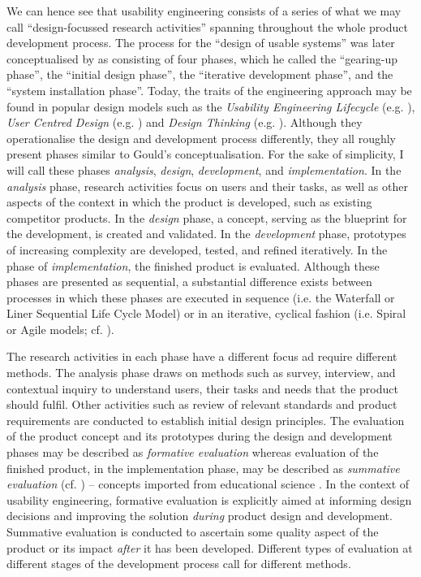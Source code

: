 We can hence see that usability engineering consists of a series of what we may call “design-focussed research activities” spanning throughout the whole product development process. The process for the ``design of usable systems'' was later conceptualised by \citet{gould1988design} as consisting of four phases, which he called the ``gearing-up phase'', the ``initial design phase'', the ``iterative development phase'', and the ``system installation phase''. Today, the traits of the engineering approach may be found in popular design models such as the \textit{Usability Engineering Lifecycle} (e.g. \cite{mayhew2007requirements,nielsen1992usability,nielsen1993usability}), \textit{User Centred Design} (e.g. \cite{still2017fundamentals}) and \textit{Design Thinking} (e.g. \cite{brown2009}). Although they operationalise the design and development process differently, they all roughly present phases similar to Gould’s conceptualisation. For the sake of simplicity, I will call these phases \textit{analysis}, \textit{design}, \textit{development}, and \textit{implementation}. In the \textit{analysis} phase, research activities focus on users and their tasks, as well as other aspects of the context in which the product is developed, such as existing competitor products. In the \textit{design} phase, a concept, serving as the blueprint for the development, is created and validated. In the \textit{development} phase, prototypes of increasing complexity are developed, tested, and refined iteratively. In the phase of \textit{implementation}, the finished product is evaluated. Although these phases are presented as sequential, a substantial difference exists between processes in which these phases are executed in sequence (i.e. the Waterfall or Liner Sequential Life Cycle Model) or in an iterative, cyclical fashion (i.e. Spiral or Agile models; cf. \cite{van2017barriers}).

The research activities in each phase have a different focus ad require different methods. The analysis phase draws on methods such as survey, interview, and contextual inquiry to understand users, their tasks and needs that the product should fulfil. Other activities such as review of relevant standards and product requirements are conducted to establish initial design principles. The evaluation of the product concept and its prototypes during the design and development phases may be described as \textit{formative evaluation} whereas evaluation of the finished product, in the implementation phase, may be described as \textit{summative evaluation} (cf. \cite{pyla2005ripple}) -- concepts imported from educational science \citep{scriven1967methodology}. In the context of usability engineering, formative evaluation is explicitly aimed at informing design decisions and improving the solution \textit{during} product design and development. Summative evaluation is conducted to ascertain some quality aspect of the product or its impact \textit{after} it has been developed. Different types of evaluation at different stages of the development process call for different methods.


